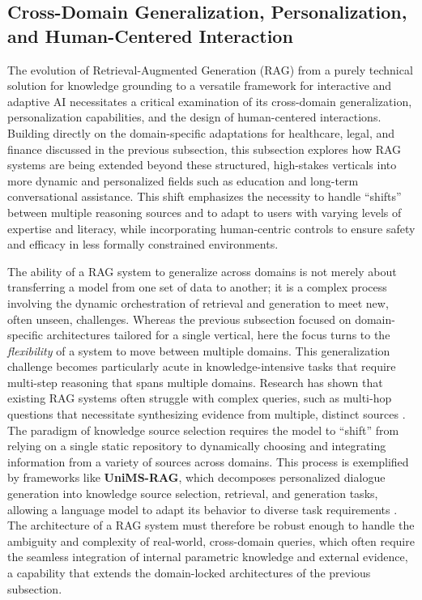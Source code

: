 \documentclass[11pt]{article}
\begin{document}
\subsection{Cross-Domain Generalization, Personalization, and Human-Centered Interaction}

The evolution of Retrieval-Augmented Generation (RAG) from a purely technical solution for knowledge grounding to a versatile framework for interactive and adaptive AI necessitates a critical examination of its cross-domain generalization, personalization capabilities, and the design of human-centered interactions. Building directly on the domain-specific adaptations for healthcare, legal, and finance discussed in the previous subsection, this subsection explores how RAG systems are being extended beyond these structured, high-stakes verticals into more dynamic and personalized fields such as education and long-term conversational assistance. This shift emphasizes the necessity to handle ``shifts'' between multiple reasoning sources and to adapt to users with varying levels of expertise and literacy, while incorporating human-centric controls to ensure safety and efficacy in less formally constrained environments.

The ability of a RAG system to generalize across domains is not merely about transferring a model from one set of data to another; it is a complex process involving the dynamic orchestration of retrieval and generation to meet new, often unseen, challenges. Whereas the previous subsection focused on domain-specific architectures tailored for a single vertical, here the focus turns to the \emph{flexibility} of a system to move between multiple domains. This generalization challenge becomes particularly acute in knowledge-intensive tasks that require multi-step reasoning that spans multiple domains. Research has shown that existing RAG systems often struggle with complex queries, such as multi-hop questions that necessitate synthesizing evidence from multiple, distinct sources \cite{ref49}. The paradigm of knowledge source selection requires the model to ``shift'' from relying on a single static repository to dynamically choosing and integrating information from a variety of sources across domains. This process is exemplified by frameworks like \textbf{UniMS-RAG}, which decomposes personalized dialogue generation into knowledge source selection, retrieval, and generation tasks, allowing a language model to adapt its behavior to diverse task requirements \cite{ref56}. The architecture of a RAG system must therefore be robust enough to handle the ambiguity and complexity of real-world, cross-domain queries, which often require the seamless integration of internal parametric knowledge and external evidence, a capability that extends the domain-locked architectures of the previous subsection.
\end{document}
